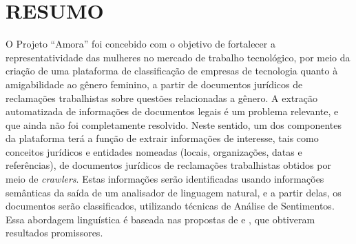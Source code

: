 \section{RESUMO}
\label{sec:resumo}
O Projeto ``Amora'' foi concebido com o objetivo de fortalecer a representatividade das mulheres no mercado de trabalho tecnológico, por meio da criação de uma plataforma de classificação de empresas de tecnologia quanto à amigabilidade ao gênero feminino, a partir de documentos jurídicos de reclamações trabalhistas sobre questões relacionadas a gênero. A extração automatizada de informações de documentos legais é um problema relevante, e que ainda não foi completamente resolvido. Neste sentido, um dos componentes da plataforma terá a função de extrair informações de interesse, tais como conceitos jurídicos e entidades nomeadas (locais, organizações, datas e referências), de documentos jurídicos de reclamações trabalhistas obtidos por meio de \textit{crawlers}. Estas informações serão identificadas usando informações semânticas da saída de um analisador de linguagem natural, e a partir delas, os documentos serão classificados, utilizando técnicas de Análise de Sentimentos. Essa abordagem linguística é baseada nas propostas de  e , que obtiveram resultados promissores.
